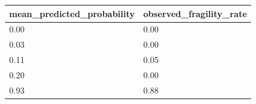 \begin{tabular}{ll}
\toprule
mean\_predicted\_probability & observed\_fragility\_rate \\
\midrule
0.00 & 0.00 \\
0.03 & 0.00 \\
0.11 & 0.05 \\
0.20 & 0.00 \\
0.93 & 0.88 \\
\bottomrule
\end{tabular}

